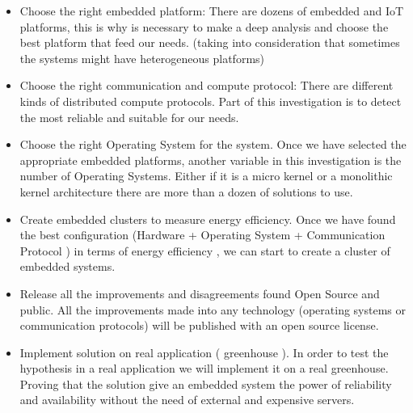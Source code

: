 \begin{itemize}

\item Choose the right embedded platform: There are dozens of embedded and IoT
platforms, this is why is necessary to make a deep analysis and choose the best
platform that feed our needs. (taking into consideration that sometimes the
systems might have heterogeneous platforms)

\item Choose the right communication and compute protocol: There are different
kinds of distributed compute protocols. Part of this investigation is to detect
the most reliable and suitable for our needs.

\item Choose the right Operating System for the system. Once we have selected
the appropriate embedded platforms, another variable in this investigation is
the number of Operating Systems. Either if it is a micro kernel or a monolithic
kernel architecture there are more than a dozen of solutions to use.

\item Create embedded clusters to measure energy efficiency. Once we have found
the best configuration (Hardware + Operating System + Communication Protocol )
in terms of energy efficiency , we can start to create a cluster of embedded
systems.

\item Release all the improvements and disagreements found Open Source and
public. All the improvements made into any technology (operating systems or
communication protocols) will be published with an open source license.

\item Implement solution on real application ( greenhouse ). In order to test
the hypothesis in a real application we will implement it on a real greenhouse.
Proving that the solution give an embedded system the power of reliability and
availability without the need of external and expensive servers.
\end{itemize}

\clearpage
